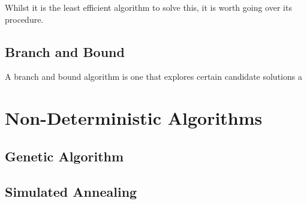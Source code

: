 \documentclass{article}
\begin{document}
Whilst it is the least efficient algorithm to solve this, it is worth going over its procedure.


\subsection{Branch and Bound}

A branch and bound algorithm is one that explores certain candidate solutions a

\section{Non-Deterministic Algorithms}

\subsection{Genetic Algorithm}

\subsection{Simulated Annealing}
\end{document}
